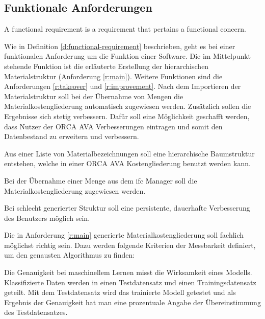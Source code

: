 \subsection{Funktionale Anforderungen}
\label{c:requirements:requirements:functional}

\begin{definition}
	\label{d:functional-requirement}
	\glqq A functional requirement is a requirement	that pertains a functional concern.\grqq{}\citep{glinz_2007}
\end{definition}

Wie in Definition \ref{d:functional-requirement} beschrieben, geht es bei einer funktionalen Anforderung um die Funktion einer Software. Die im Mittelpunkt stehende Funktion ist die erläuterte Erstellung der hierarchischen Materialstruktur (Anforderung \ref{r:main}). Weitere Funktionen sind die Anforderungen \ref{r:takeover} und \ref{r:improvement}. Nach dem Importieren der Materialstruktur soll bei der Übernahme von Mengen die Materialkostengliederung automatisch zugewiesen werden. Zusätzlich sollen die Ergebnisse sich stetig verbessern. Dafür soll eine Möglichkeit geschafft werden, dass Nutzer der ORCA AVA Verbesserungen eintragen und somit den Datenbestand zu erweitern und verbessern.

\begin{requirement}
	\label{r:main}
	Aus einer Liste von Materialbezeichnungen soll eine hierarchische Baumstruktur entstehen, welche in einer ORCA AVA Kostengliederung benutzt werden kann.
\end{requirement}

\begin{requirement}
	\label{r:takeover}
	Bei der Übernahme einer Menge aus dem \ac{ifc} Manager soll die Materialkostengliederung zugewiesen werden.
\end{requirement}

\begin{requirement}
	\label{r:improvement}
	Bei schlecht generierter Struktur soll eine persistente, dauerhafte Verbesserung des Benutzers möglich sein.
\end{requirement}

Die in Anforderung \ref{r:main} generierte Materialkostengliederung soll fachlich möglichst richtig sein. Dazu werden folgende Kriterien der Messbarkeit definiert, um den genausten Algorithmus zu finden:

Die Genauigkeit bei maschinellem Lernen misst die Wirksamkeit eines Modells. Klassifizierte Daten werden in einen Testdatensatz und einen Trainingsdatensatz geteilt. Mit dem Testdatensatz wird das trainierte Modell getestet und als Ergebnis der Genauigkeit hat man eine prozentuale Angabe der Übereinstimmung des Testdatensatzes. \citep{Microsoft_2022_ml}

